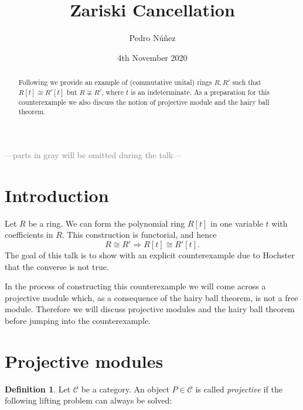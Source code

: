 \documentclass[A4paper, 12pt, british, reqno]{amsart}
\author{Pedro N\'{u}\~{n}ez}
\title[Zariski Cancellation]{Zariski Cancellation}
\date{4th November 2020}
\newcommand{\calC}{\mathcal{C}}
\theoremstyle{plain}
\theoremstyle{definition}
\newtheorem{defn}[thm]{Definition}
\theoremstyle{remark}
\theoremstyle{plain}
\theoremstyle{definition}
\theoremstyle{remark}
\theoremstyle{plain}
\theoremstyle{definition}
\theoremstyle{remark}
\begin{document}

\maketitle

\begin{abstract}
    Following \cite{hoc72} we provide an example of (commutative unital) rings $R,R'$ such that $R[t]\cong R'[t]$ but $R\not\cong R'$, where $t$ is an indeterminate.
    As a preparation for this counterexample we also discuss the notion of projective module and the hairy ball theorem.	
\end{abstract}

\tableofcontents

\begin{center}
    \textcolor{gray}{---parts in gray will be omitted during the talk---}
\end{center}

\section{Introduction}

Let $R$ be a ring.
We can form the polynomial ring $R[t]$ in one variable $t$ with coefficients in $R$.
This construction is functorial, and hence
\[ R\cong R' \Rightarrow R[t]\cong R'[t]. \]
The goal of this talk is to show with an explicit counterexample due to Hochster \cite{hoc72} that the converse is not true.

In the process of constructing this counterexample we will come across a projective module which, as a consequence of the hairy ball theorem, is not a free module.
Therefore we will discuss projective modules and the hairy ball theorem before jumping into the counterexample.

\section{Projective modules}

\begin{defn}
    Let $\calC$ be a category.
    An object $P\in \calC$ is called \textit{projective} if the following lifting problem can always be solved:
    
    \begin{center}
    \end{center}
\end{defn}
\end{document}
